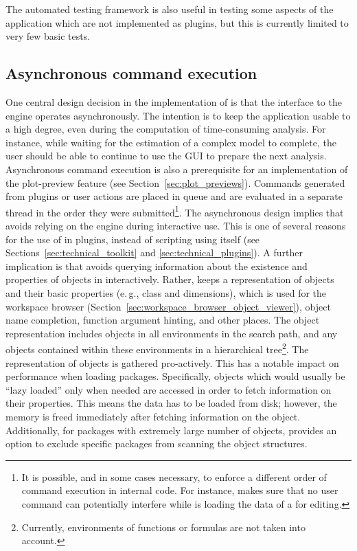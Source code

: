 \documentclass[article,shortnames]{jss}
\begin{document}
The automated testing framework is also useful in testing some aspects of the
application which are not implemented as plugins, but this is currently limited
to very few basic tests.

\subsection{Asynchronous command execution}
\label{sec:technical_asynchronous}
One central design decision in the implementation of  is that the
interface to the  engine operates asynchronously. The intention is to
keep the application usable to a high degree, even during the computation of
time-consuming analysis. For instance, while waiting for the estimation of a
complex model to complete, the user should be able to continue to use the GUI to
prepare the next analysis. Asynchronous command execution is also a prerequisite
for an implementation of the plot-preview feature (see Section~\ref{sec:plot_previews}). Commands
generated from plugins or user actions are placed in queue and are evaluated in
a separate thread in the order they were submitted\footnote{
    It is possible, and in some cases necessary, to enforce a different order of command execution in
    internal code. For instance,  makes sure that no user command can
    potentially interfere while  is loading the data of a  for
    editing.
}. The asynchronous design implies that  avoids relying on the
 engine during interactive use. This is one of several reasons for
the use of  in plugins, instead of scripting using
 itself (see Sections~\ref{sec:technical_toolkit} and \ref{sec:technical_plugins}).
A further implication is that  avoids querying information about the
existence and properties of objects in  interactively. Rather,
 keeps a representation of  objects and their basic properties
(e.\,g., class and dimensions), which is used for the workspace browser (Section~\ref{sec:workspace_browser_object_viewer}),
object name completion, function argument hinting, and
other places. The object representation includes objects in all environments
in the search path, and any objects contained within these environments in a
hierarchical tree\footnote{
    Currently, environments of functions or formulas are not taken into account.
}. The representation of  objects is gathered
pro-actively. This has a notable impact on performance when loading packages.
Specifically, objects which would usually be ``lazy loaded'' only when needed \citep[see][]{Ripley2004} are
accessed in order to fetch information on their properties. This means the data
has to be loaded from disk; however, the memory is freed immediately after fetching
information on the object. Additionally, for packages with extremely large number of objects, 
provides an option to exclude specific packages from scanning the object structures.
\end{document}
